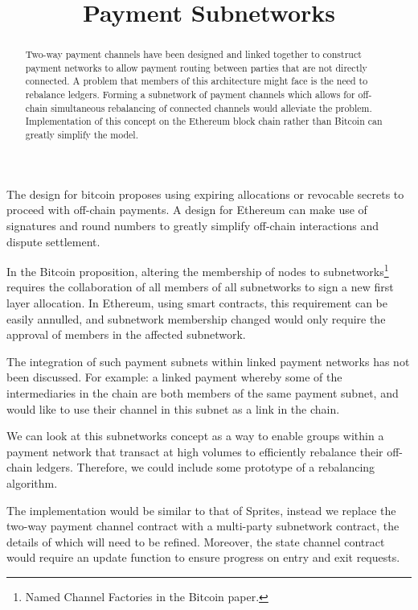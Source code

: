 \documentclass[12pt]{article}
\title{Payment Subnetworks\vspace{-5em}}
\date{}
\author{}
\begin{document}
\maketitle
\begin{abstract}
Two-way payment channels have been designed and linked together to construct payment networks to allow payment routing between parties that are not directly connected. A problem that members of this architecture might face is the need to rebalance ledgers. Forming a subnetwork of payment channels which allows for off-chain simultaneous rebalancing of connected channels would alleviate the problem. Implementation of this concept on the Ethereum block chain rather than Bitcoin can greatly simplify the model.
\end{abstract}

The design for bitcoin proposes using expiring allocations or revocable secrets to proceed with off-chain payments. A design for Ethereum can make use of signatures and round numbers to greatly simplify off-chain interactions and dispute settlement.

In the Bitcoin proposition, altering the membership of nodes to subnetworks\footnote{Named Channel Factories in the Bitcoin paper.} requires the collaboration of all members of all subnetworks to sign a new first layer allocation. In Ethereum, using smart contracts, this requirement can be easily annulled, and subnetwork membership changed would only require the approval of members in the affected subnetwork.

The integration of such payment subnets within linked payment networks has not been discussed. For example: a linked payment whereby some of the intermediaries in the chain are both members of the same payment subnet, and would like to use their channel in this subnet as a link in the chain.

We can look at this subnetworks concept as a way to enable groups within a payment network that transact at high volumes to efficiently rebalance their off-chain ledgers. Therefore, we could include some prototype of a rebalancing algorithm.

The implementation would be similar to that of Sprites, instead we replace the two-way payment channel contract with a multi-party subnetwork contract, the details of which will need to be refined. Moreover, the state channel contract would require an update function to ensure progress on entry and exit requests.
\end{document}
